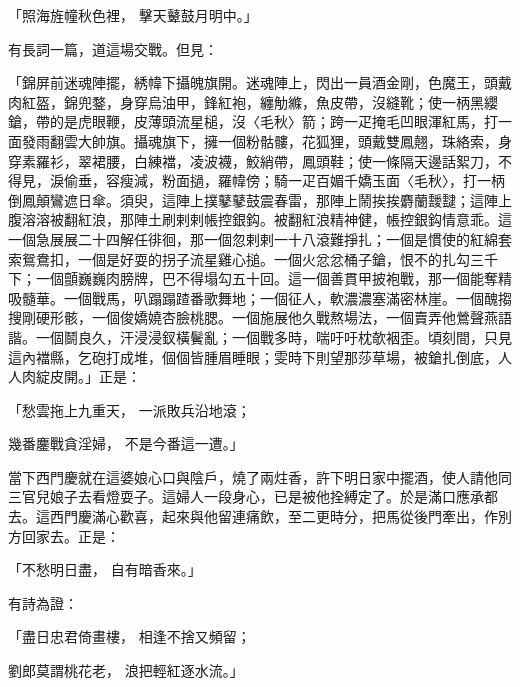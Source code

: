 \begin{showcontents}{}
「照海旌幢秋色裡，  擊天鼙鼓月明中。」

有長詞一篇，道這場交戰。但見：

「錦屏前迷魂陣擺，綉幃下攝魄旗開。迷魂陣上，閃出一員酒金剛，色魔王，頭戴肉紅盔，錦兜鍪，身穿烏油甲，鋒紅袍，纏觔縧，魚皮帶，沒縫靴；使一柄黑纓鎗，帶的是虎眼鞭，皮薄頭流星槌，沒〈毛秋〉箭；跨一疋掩毛凹眼渾紅馬，打一面發雨翻雲大帥旗。攝魂旗下，擁一個粉骷髏，花狐狸，頭戴雙鳳翹，珠絡索，身穿素羅衫，翠裙腰，白練襠，凌波襪，鮫綃帶，鳳頭鞋；使一條隔天邊話絮刀，不得見，淚偷垂，容瘦減，粉面撾，羅幃傍；騎一疋百媚千嬌玉面〈毛秋〉，打一柄倒鳳顛鸞遮日傘。須臾，這陣上撲鼕鼕鼓震春雷，那陣上鬧挨挨麝蘭靉靆；這陣上腹溶溶被翻紅浪，那陣土刷剌剌帳控銀鈎。被翻紅浪精神健，帳控銀鈎情意乖。這一個急展展二十四解任徘徊，那一個忽剌剌一十八滾難掙扎；一個是慣使的紅綿套索鴛鴦扣，一個是好耍的拐子流星雞心搥。一個火忿忿桶子鎗，恨不的扎勾三千下；一個顫巍巍肉膀牌，巴不得塌勾五十回。這一個善貫甲披袍戰，那一個能奪精吸髓華。一個戰馬，叭蹋蹋蹅番歌舞地；一個征人，軟濃濃塞滿密林崖。一個醜搊搜剛硬形骸，一個俊嬌嬈杏臉桃腮。一個施展他久戰熬場法，一個賣弄他鶯聲燕語諧。一個鬬良久，汗浸浸釵橫鬢亂；一個戰多時，喘吁吁枕欹裀歪。頃刻間，只見這內襠縣，乞砲打成堆，個個皆腫眉睡眼；雯時下則望那莎草場，被鎗扎倒底，人人肉綻皮開。」正是：

「愁雲拖上九重天，  一派敗兵沿地滾；

幾番鏖戰貪淫婦，  不是今番這一遭。」

當下西門慶就在這婆娘心口與陰戶，燒了兩炷香，許下明日家中擺酒，使人請他同三官兒娘子去看燈耍子。這婦人一段身心，已是被他拴縛定了。於是滿口應承都去。這西門慶滿心歡喜，起來與他留連痛飲，至二更時分，把馬從後門牽出，作別方回家去。正是：

「不愁明日盡，  自有暗香來。」

有詩為證：

「盡日忠君倚畫樓，  相逢不捨又頻留；

劉郎莫謂桃花老，  浪把輕紅逐水流。」


\end{showcontents}
